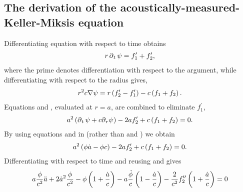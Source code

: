 \subsection{The derivation of the acoustically-measured-Keller-Miksis equation}
Differentiating equation  with respect to time obtains
\begin{align}
  r \operatorname{\partial}_t \psi =  f_1^\prime + f_2^\prime, \label{eqn:dtAnsatz}
\end{align}
where the prime denotes differentiation with respect to the argument,
while differentiating with respect to the radius gives,
\begin{align}
 r^2 c \nabla \psi = r \left( f_2^\prime - f_1^\prime \right) - c\left( f_1+f_2 \right). \label{eqn:drAnsatz}
\end{align}
Equations  and , evaluated at $r = a$, are combined to eliminate $f_1^\prime$,
\begin{align}
  a^2 \left( \operatorname{\partial}_t \psi + c {\operatorname{\partial}_r} \psi \right) - 2 a f_2^\prime + c\left( f_1 + f_2 \right) = 0. \label{eqn:Combo1}
\end{align}
By using equations  and  in  (rather than  and ) 
we obtain
\begin{align}
a^2 \left( \phi \dot a -\phi c  \right) - 2 a f_2^\prime + c\left( f_1 + f_2 \right) = 0.  \label{eqn:Combo2}
\end{align}
Differentiating  with respect to time and reusing  and  gives
\begin{align}
  a \frac{\phi}{c^2} \ddot a + 2 {\dot a}^2\frac{\phi}{c^2} - \phi\left( 1 + \frac{\dot a}{c} \right) - a \frac{\dot \phi}{c}\left( 1-\frac{\dot a}{c} \right) - \frac{2}{c^2} f_2^{\prime\prime}\left( 1+\frac{\dot a}{c} \right) = 0
  \label{eqn:Combo3}
\end{align}

